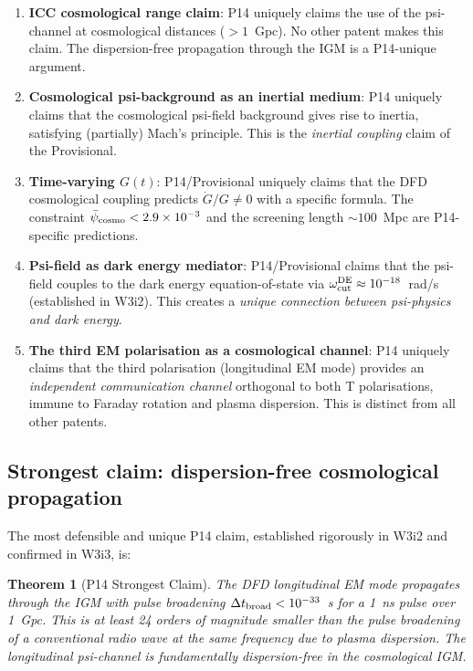 \documentclass[11pt]{article}
\newtheorem{theorem}{Theorem}
\newcommand{\ee}[1]{\times 10^{#1}}
\newcommand{\psibar}{\bar{\psi}}
\begin{document}
\begin{enumerate}
\item \textbf{ICC cosmological range claim}: P14 uniquely claims the use of the
  psi-channel at cosmological distances ($>1$~Gpc). No other patent makes this
  claim. The dispersion-free propagation through the IGM is a P14-unique argument.

\item \textbf{Cosmological psi-background as an inertial medium}: P14 uniquely
  claims that the cosmological psi-field background gives rise to inertia,
  satisfying (partially) Mach's principle. This is the \emph{inertial coupling}
  claim of the Provisional.

\item \textbf{Time-varying $G(t)$}: P14/Provisional uniquely claims that the
  DFD cosmological coupling predicts $\dot{G}/G \neq 0$ with a specific formula.
  The constraint $\psibar_{\rm cosmo} < 2.9\ee{-3}$ and the screening length
  $\sim 100$~Mpc are P14-specific predictions.

\item \textbf{Psi-field as dark energy mediator}: P14/Provisional claims that
  the psi-field couples to the dark energy equation-of-state via
  $\omega_{\rm cut}^{\rm DE} \approx 10^{-18}$~rad/s (established in W3i2).
  This creates a \emph{unique connection between psi-physics and dark energy}.

\item \textbf{The third EM polarisation as a cosmological channel}: P14 uniquely
  claims that the third polarisation (longitudinal EM mode) provides an
  \emph{independent communication channel} orthogonal to both T polarisations,
  immune to Faraday rotation and plasma dispersion. This is distinct from
  all other patents.
\end{enumerate}

\subsection{Strongest claim: dispersion-free cosmological propagation}

The most defensible and unique P14 claim, established rigorously in W3i2 and
confirmed in W3i3, is:

\begin{theorem}[P14 Strongest Claim]
The DFD longitudinal EM mode propagates through the IGM with pulse broadening
$\Delta t_{\rm broad} < 10^{-33}$~s for a 1~ns pulse over 1~Gpc. This is
\emph{at least 24 orders of magnitude smaller} than the pulse broadening of
a conventional radio wave at the same frequency due to plasma dispersion.
The longitudinal psi-channel is fundamentally dispersion-free in the
cosmological IGM.
\end{theorem}
\end{document}
